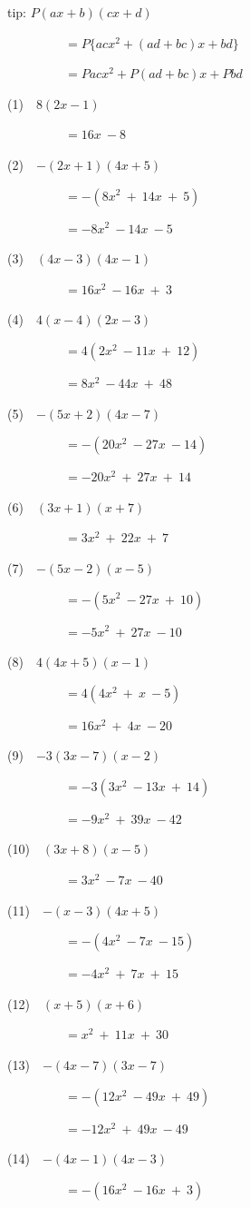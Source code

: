 \documentclass[a4j,twocolumn,10pt,fleqn]{jarticle}
\begin{document}
tip: $P(ax + b)(cx + d)$

~~~~~~~~~$= P\{acx^2 + (ad + bc)x +bd\}$

~~~~~~~~~$= Pacx^2 + P(ad + bc)x + Pbd$

(1)~~$8(2x-1)$

~~~~~~~~~$=16x~-8$

(2)~~$-(2x+1)(4x+5)$

~~~~~~~~~$=-(8x^2~+~14x~+~5)$

~~~~~~~~~$=-8x^2~-14x~-5$

(3)~~$(4x-3)(4x-1)$

~~~~~~~~~$=16x^2~-16x~+~3$

(4)~~$4(x-4)(2x-3)$

~~~~~~~~~$=4(2x^2~-11x~+~12)$

~~~~~~~~~$=8x^2~-44x~+~48$

(5)~~$-(5x+2)(4x-7)$

~~~~~~~~~$=-(20x^2~-27x~-14)$

~~~~~~~~~$=-20x^2~+~27x~+~14$

(6)~~$(3x+1)(x+7)$

~~~~~~~~~$=3x^2~+~22x~+~7$

(7)~~$-(5x-2)(x-5)$

~~~~~~~~~$=-(5x^2~-27x~+~10)$

~~~~~~~~~$=-5x^2~+~27x~-10$

(8)~~$4(4x+5)(x-1)$

~~~~~~~~~$=4(4x^2~+~x~-5)$

~~~~~~~~~$=16x^2~+~4x~-20$

(9)~~$-3(3x-7)(x-2)$

~~~~~~~~~$=-3(3x^2~-13x~+~14)$

~~~~~~~~~$=-9x^2~+~39x~-42$

(10)~~$(3x+8)(x-5)$

~~~~~~~~~$=3x^2~-7x~-40$

(11)~~$-(x-3)(4x+5)$

~~~~~~~~~$=-(4x^2~-7x~-15)$

~~~~~~~~~$=-4x^2~+~7x~+~15$

(12)~~$(x+5)(x+6)$

~~~~~~~~~$=x^2~+~11x~+~30$

(13)~~$-(4x-7)(3x-7)$

~~~~~~~~~$=-(12x^2~-49x~+~49)$

~~~~~~~~~$=-12x^2~+~49x~-49$

(14)~~$-(4x-1)(4x-3)$

~~~~~~~~~$=-(16x^2~-16x~+~3)$
\end{document}
